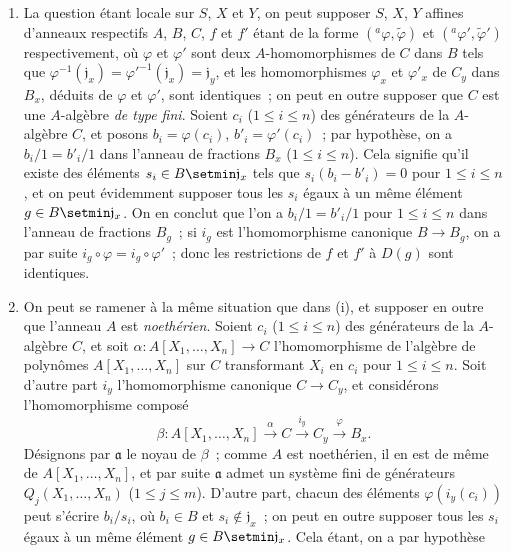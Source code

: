 \begin{enumerate}
  \item[(i)] La question étant locale sur $S$, $X$ et $Y$, on peut supposer
    $S$, $X$, $Y$ affines d'anneaux respectifs $A$, $B$, $C$, $f$ et $f'$
    étant de la forme $({}^a\varphi,\widetilde{\varphi})$ et
    $({}^a\varphi',\widetilde{\varphi}')$ respectivement, où $\varphi$ et
    $\varphi'$ sont deux $A$-homomorphismes de $C$ dans $B$ tels que
    $\varphi^{-1}(\mathfrak{j}_x)={\varphi'}^{-1}(\mathfrak{j}_x)
    =\mathfrak{j}_y$, et les homomorphismes $\varphi_x$ et $\varphi'_x$ de
    $C_y$ dans $B_x$, déduits de $\varphi$ et $\varphi'$, sont identiques~;
    on peut en outre supposer que $C$ est une $A$-algèbre \emph{de type fini}. Soient
    $c_i$ ($1\leq i\leq n$) des générateurs de la $A$-algèbre $C$, et posons
    $b_i=\varphi(c_i)$, $b'_i=\varphi'(c_i)$~; par hypothèse, on a
    $b_i/1=b'_i/1$ dans l'anneau de fractions $B_x$ ($1\leq i\leq n$). Cela
    signifie qu'il existe des éléments $s_i\in B\setmin\mathfrak{j}_x$ tels que
    $s_i(b_i-b'_i)=0$ pour $1\leq i\leq n$, et on peut évidemment supposer
    tous les $s_i$ égaux à un même élément $g\in B\setmin\mathfrak{j}_x$. On en
    conclut que l'on a $b_i/1=b'_i/1$ pour $1\leq i\leq n$ dans l'anneau de
    fractions $B_g$~; si $i_g$ est l'homomorphisme canonique $B\to B_g$, on a
    par suite $i_g\circ\varphi=i_g\circ\varphi'$~; donc les restrictions de
    $f$ et $f'$ à $D(g)$ sont identiques.
  \item[(ii)] On peut se ramener à la même situation que dans (i), et supposer
    en outre que l'anneau $A$ est \emph{noethérien}. Soient $c_i$
    ($1\leq i\leq n$) des générateurs de la $A$-algèbre $C$, et soit
    $\alpha:A[X_1,\ldots,X_n]\to C$ l'homomorphisme de l'algèbre de polynômes
    $A[X_1,\ldots,X_n]$ sur $C$ transformant $X_i$ en $c_i$ pour
    $1\leq i\leq n$. Soit d'autre part $i_y$ l'homomorphisme canonique
    $C\to C_y$, et considérons l'homomorphisme composé
    \[
      \beta:A[X_1,\ldots,X_n]
      \xrightarrow{\alpha} C
      \xrightarrow{i_y} C_y
      \xrightarrow{\varphi} B_x.
    \]
    Désignons par $\mathfrak{a}$ le noyau de $\beta$~; comme $A$ est
    noethérien, il en est de même de $A[X_1,\ldots,X_n]$, et par suite
    $\mathfrak{a}$ admet un système fini de générateurs
    $Q_j(X_1,\ldots,X_n)$ ($1\leq j\leq m$). D'autre part, chacun des
    éléments $\varphi(i_y(c_i))$ peut s'écrire $b_i/s_i$, où $b_i\in B$ et
    $s_i\notin\mathfrak{j}_x$~; on peut en outre supposer tous les $s_i$ égaux
    à un même élément $g\in B\setmin\mathfrak{j}_x$. Cela étant, on a par hypothèse

\end{enumerate}
